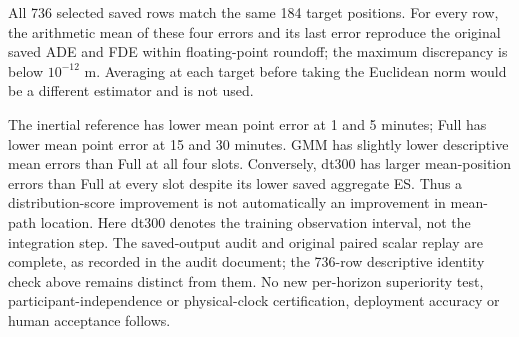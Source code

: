 All 736 selected saved rows match the same 184 target positions. For every row, the arithmetic mean of these four errors and its last error reproduce the original saved ADE and FDE within floating-point roundoff; the maximum discrepancy is below $10^{-12}$ m. Averaging at each target before taking the Euclidean norm would be a different estimator and is not used.

The inertial reference has lower mean point error at 1 and 5 minutes; Full has lower mean point error at 15 and 30 minutes. GMM has slightly lower descriptive mean errors than Full at all four slots. Conversely, dt300 has larger mean-position errors than Full at every slot despite its lower saved aggregate ES. Thus a distribution-score improvement is not automatically an improvement in mean-path location. Here dt300 denotes the training observation interval, not the integration step. The saved-output audit and original paired scalar replay are complete, as recorded in the audit document; the 736-row descriptive identity check above remains distinct from them. No new per-horizon superiority test, participant-independence or physical-clock certification, deployment accuracy or human acceptance follows.
\FloatBarrier
